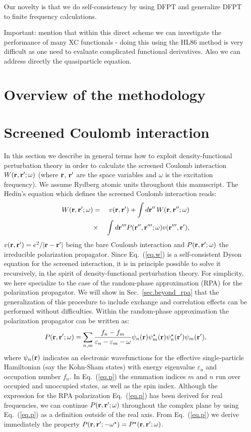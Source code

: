 \documentclass[twocolumn,prb,showpacs,superscriptaddress]{revtex4}
\def\w{\omega}
\def\E{\varepsilon}
\def\r{{\bf r}}
\def\rp{{\bf r^\prime}}
\def\rpp{{\bf r^{\prime\prime}}}
\def\rppp{{\bf r^{\prime\prime\prime}}}
\begin{document}
Our novelty is that we do self-consistency by using DFPT
and generalize DFPT to finite frequency calculations.

Important: mention that within this direct scheme we can investigate
the performance of many XC functionals - doing this using the HL86
method is very difficult as one need to evaluate complicated functional
derivatives. Also we can address directly the quasiparticle equation.


\section{Overview of the methodology}

\section{Screened Coulomb interaction}\label{sec.coulomb}

In this section we describe in general terms how to exploit density-functional
perturbation theory in order to calculate the screened Coulomb interaction
$W(\r,\rp;\w)$ (where $\r$, $\rp$ are the space variables and $\w$ is the
excitation frequency). We assume Rydberg atomic units throughout this manuscript. 
The Hedin's equation which defines the screened Coulomb 
interaction reads:\cite{hl}
  \begin{eqnarray}\label{eq.w}
  W(\r,\rp;\w) & = & v(\r,\rp) + \int d\rpp \,W(\r,\rpp;\w)  \nonumber \\
   & \times & \int d\rppp P(\rpp,\rppp;\w) v(\rppp,\rp),
  \end{eqnarray}
$v(\r,\rp)=e^2/|\r-\rp|$ being the bare Coulomb interaction and 
$P(\r,\rp;\w)$ the irreducible polarization propagator. 
Since Eq.\ (\ref{eq.w}) is a self-consistent Dyson equation for the
screened interaction, it is in principle possible to solve it
recursively, in the spirit of density-functional perturbation theory.
For simplicity, we here specialize to the case of the random-phase approximation (RPA)
for the polarization propagator. We will show in Sec.\ \ref{sec.beyond_rpa}
that the generalization of this procedure to include exchange and correlation
effects can be performed without difficulties.
Within the random-phase approximation the polarization propagator can be written as:\cite{hl}
  \begin{equation}\label{eq.p}
  P(\r,\rp;\w) = \sum_{n,m} \frac{f_n-f_m}{\E_n-\E_m-\w} 
  \psi_n(\r)\psi_m^\star(\r)  \psi_n^\star(\rp)\psi_m(\rp),
  \end{equation}
where $\psi_n(\r)$ indicates an electronic wavefunctions for the
effective single-particle Hamiltonian (say the Kohn-Sham states)
with energy eigenvalue $\E_n$ and occupation number $f_n$. 
In Eq.\ (\ref{eq.p}) the summation indices $m$ and $n$ run over
occupied and unoccupied states, as well as the spin index.
Although the expression for the RPA polarization Eq.\ (\ref{eq.p})
has been derived for real frequencies,\cite{hl} we can continue
$P(\r,\rp;\w)$ throughout the complex plane by using Eq.~(\ref{eq.p})
as a definition outside of the real axis.
From Eq.\ (\ref{eq.p}) we derive immediately the property 
$P(\r,\rp;-\w^\star)=P^\star(\r,\rp;\w)$.
\end{document}
